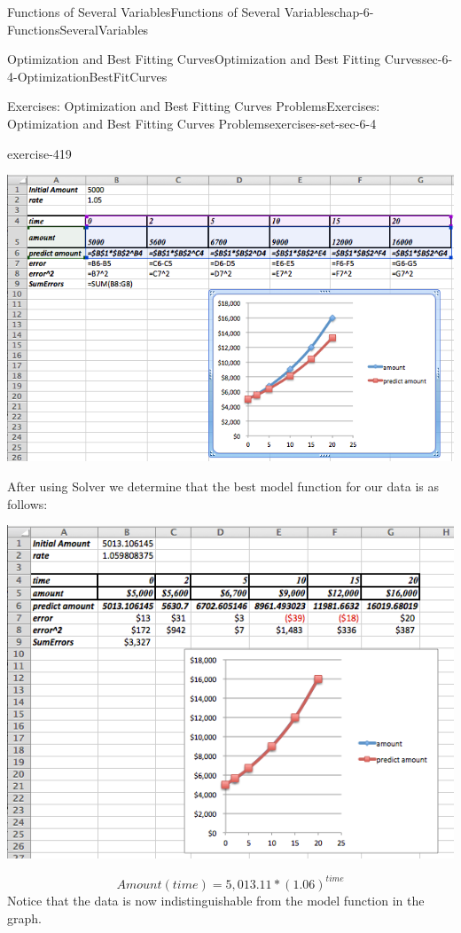 \documentclass[oneside,10pt,]{book}
\numberwithin{equation}{section}
\begin{document}
\begin{chapterptx}{Functions of Several Variables}{}{Functions of Several Variables}{}{}{chap-6-FunctionsSeveralVariables}
\begin{sectionptx}{Optimization and Best Fitting Curves}{}{Optimization and Best Fitting Curves}{}{}{sec-6-4-OptimizationBestFitCurves}
\begin{exercises-subsection-numberless}{Exercises: Optimization and Best Fitting Curves Problems}{}{Exercises: Optimization and Best Fitting Curves Problems}{}{}{exercises-set-sec-6-4}
\begin{divisionexercise}{5}{}{}{exercise-419}
\begin{sidebyside}{1}{0}{0}{0}
\begin{sbspanel}{1}
\includegraphics[width=1\linewidth]{images/sec6-4-sol5b.png}
\end{sbspanel}%
\end{sidebyside}%
\par
\hypertarget{p-2510}{}%
After using Solver we determine that the best model function for our data is as follows:%
\begin{sidebyside}{1}{0}{0}{0}%
\begin{sbspanel}{1}%
\includegraphics[width=1\linewidth]{images/sec6-4-sol5c.png}
\end{sbspanel}%
\end{sidebyside}%
%
\begin{equation*}
Amount(time)=5,013.11* (1.06)^{time}
\end{equation*}
\hypertarget{p-2511}{}%
Notice that the data is now indistinguishable from the model function in the graph.%

\end{divisionexercise}
\end{exercises-subsection-numberless}
\end{sectionptx}
\end{chapterptx}
\end{document}

